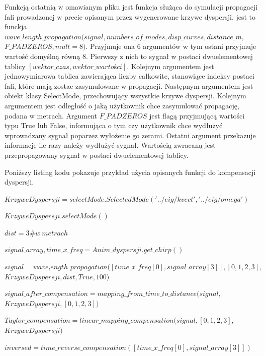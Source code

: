 Funkcją ostatnią w omawianym pliku jest funkcja służąca do symulacji propagacji fali prowadzonej w precie opisanym przez wygenerowane krzywe dyspersji. jest to funckja $wave\_length\_propagation(signal, numbers\_of\_modes, disp\_curves, distance\_m,$
$ F\_PADZEROS, mult=8)$. Przyjmuje ona 6 argumentów w tym ostani przyjmuje wartość domyślną równą 8. Pierwszy z nich to sygnał w postaci dwuelementowej tablicy $[wektor\_czas, wektor\_wartości]$. Kolejnym argumentem jest jednowymiarowa tablica zawierająca liczby całkowite, stanowiące indeksy postaci fali, które mają zostac zasymulowane w propagacji. Następnym argumentem jest obiekt klasy SelectMode, przechowujący wszystkie krzywe dyspersji. Kolejnym argumentem jest odległość o jaką użytkownik chce zasymulować propagację, podana w metrach. Argument $F\_PADZEROS$ jest flagą przyjmującą wartości typu True lub False, informująca o tym czy użytkownik chce wydłużyć wprowadzany sygnał poparzez wyłożenie go zerami. Ostatni argument przekazuje informację ile razy należy wydłużyć sygnał. Wartością zwracaną jest przepropagowany sygnał w postaci dwuelementowej tablicy.

Poniższy listing kodu pokazuje przykład użycia opisanych funkcji do kompensacji dyspersji.

$KrzyweDyspersji= selectMode.SelectedMode('../eig/kvect', '../eig/omega')$

$KrzyweDyspersji.selectMode()$

$dist = 3 \# w\ metrach$

$signal\_array, time\_x\_freq = Anim\_dyspersji.get\_chirp()$

$signal = wave_length\_propagation([time\_x\_freq[0], signal\_array[3]], [0, 1, 2, 3],$
$KrzyweDyspersji, dist, True, 100)$

$signal\_after\_compensation = mapping\_from\_time\_to\_distance(signal,$
$KrzyweDyspersji, [0, 1, 2, 3])$

$Taylor\_compensation = linear\_mapping\_compensation(signal, [0, 1, 2, 3],$
$KrzyweDyspersji)$

$inversed = time\_reverse\_compensation([time\_x\_freq[0], signal\_array[3]])$